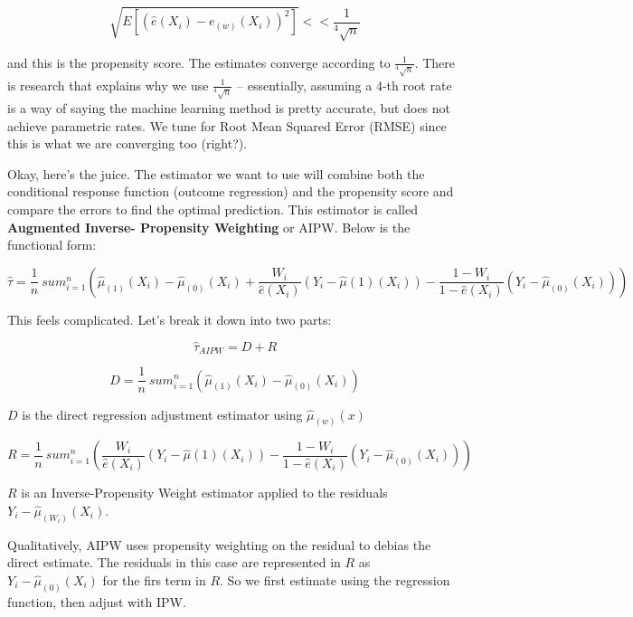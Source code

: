 \documentclass{article}
\begin{document}
\begin{equation}
    \sqrt{E[ (\hat{e}(X_i) - e_{(w)}(X_i))^2  ]} << \frac{1}{^4\sqrt{n}}
\end{equation}


and this is the propensity score. The estimates converge according to $\frac{1}{^4\sqrt{n}}$. There is research that explains why we use $\frac{1}{^4\sqrt{n}}$ -- essentially, assuming a 4-th root rate is a way of saying the machine learning method is pretty accurate, but does not achieve parametric rates. We tune for Root Mean Squared Error (RMSE) since this is what we are converging too (right?).

Okay, here's the juice. The estimator we want to use will combine both the conditional response function (outcome regression) and the propensity score and compare the errors to find the optimal prediction. This estimator is called \textbf{Augmented Inverse- Propensity Weighting} or AIPW. Below is the functional form:

\begin{equation}
    \hat{\tau} = \frac{1}{n} \ sum_{i=1}^n (\hat{\mu}_{(1)} (X_i) - \hat{\mu}_{(0)} (X_i) + \frac{W_i}{\hat{e}(X_i)} (Y_i - \hat{\mu}(1) (X_i)) - \frac{1- W_i}{1- \hat{e}(X_i)}(Y_i - \hat{\mu}_{(0)}(X_i)) )
\end{equation}

This feels complicated. Let's break it down into two parts:

\begin{equation}
    \hat{\tau}_{AIPW} = D + R
\end{equation}

\begin{equation}
    D = \frac{1}{n} \ sum_{i=1}^n (\hat{\mu}_{(1)} (X_i) - \hat{\mu}_{(0)} (X_i))
\end{equation}

$D$ is the direct regression adjustment estimator using $\hat{\mu}_{(w)} (x)$


\begin{equation}
    R = \frac{1}{n} \ sum_{i=1}^n (\frac{W_i}{\hat{e}(X_i)} (Y_i - \hat{\mu}(1) (X_i)) - \frac{1- W_i}{1- \hat{e}(X_i)}(Y_i - \hat{\mu}_{(0)}(X_i)) )
\end{equation}

$R$ is an Inverse-Propensity Weight estimator applied to the residuals $Y_i - \hat{\mu}_{(W_i)} (X_i)$.

Qualitatively, AIPW uses propensity weighting on the residual to debias the direct estimate. The residuals in this case are represented in $R$ as $Y_i - \hat{\mu}_{(0)}(X_i)$ for the firs term in $R$. So we first estimate using the regression function, then adjust with IPW.
\end{document}
